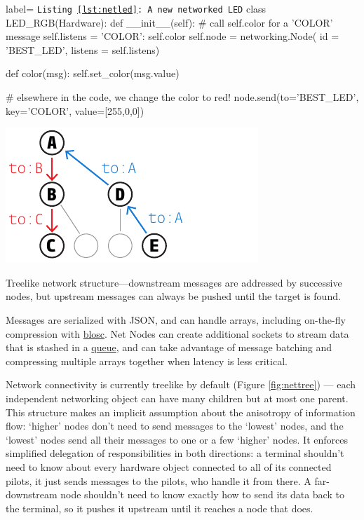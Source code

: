 \begin{listing}[H]
\begin{pythoncode*}{label= \texttt{Listing \ref{lst:netled}: A new networked LED}}
class LED_RGB(Hardware):
    def __init__(self):
        # call self.color for a 'COLOR' message
        self.listens = {'COLOR': self.color}
        self.node = networking.Node(
            id      = 'BEST_LED',
            listens = self.listens)
        
    def color(msg):
        self.set_color(msg.value)
        
# elsewhere in the code, we change the color to red!
node.send(to='BEST_LED', key='COLOR', value=[255,0,0])
\end{pythoncode*}
\captionlistentry{}
\label{lst:netled}
\end{listing}
\begin{marginfigure}[0cm]
\includegraphics[]{figures/side_25_tree.pdf}
\caption{Treelike network structure---downstream messages are addressed by successive nodes, but upstream messages can always be pushed until the target is found.}
\label{fig:nettree}
\end{marginfigure}

Messages are serialized with JSON, and can handle arrays, including on-the-fly compression with \href{https://www.blosc.org/}{blosc}. Net Nodes can create additional sockets to stream data that is stashed in a \href{https://docs.python.org/3/library/queue.html\#queue.Queue}{queue}, and can take advantage of message batching and compressing multiple arrays together when latency is less critical.

Network connectivity is currently treelike by default (Figure \ref{fig:nettree}) --- each independent networking object can have many children but at most one parent. This structure makes an implicit assumption about the anisotropy of information flow: `higher' nodes don't need to send messages to the `lowest' nodes, and the `lowest' nodes send all their messages to one or a few `higher' nodes. It enforces simplified delegation of responsibilities in both directions: a terminal shouldn't need to know about every hardware object connected to all of its connected pilots, it just sends messages to the pilots, who handle it from there. A far-downstream node shouldn't need to know exactly how to send its data back to the terminal, so it pushes it upstream until it reaches a node that does.

